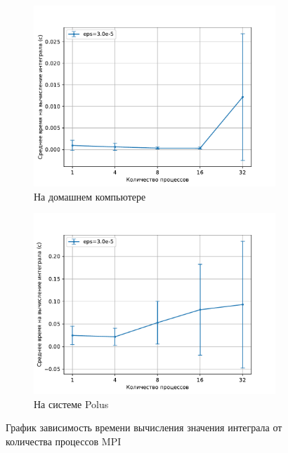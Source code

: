 \documentclass{article}
\begin{document}
\begin{figure}[!t]
\centering
\begin{subfigure}[b]{0.49\textwidth}
    \centering
    \includegraphics[width=\textwidth,trim=0 0 0 0,clip]{3.0e-5_home_pc_time.pdf}
    \caption{На домашнем компьютере}
    \label{img:3.1}
\end{subfigure}
\begin{subfigure}[b]{0.49\textwidth}
    \centering
    \includegraphics[width=\textwidth,trim=0 0 0 0,clip]{3.0e-5_polus_time.pdf}
    \caption{На системе Polus}
    \label{img:3.2}
\end{subfigure}
\caption{График зависимость времени вычисления значения интеграла от количества процессов MPI}
\end{figure}
\end{document}
